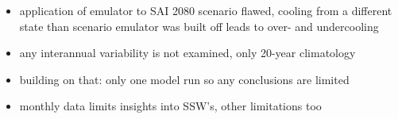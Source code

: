 \begin{itemize}
    \item application of emulator to SAI 2080 scenario flawed, cooling from a different state than scenario emulator was built off leads to over- and undercooling
    \item any interannual variability is not examined, only 20-year climatology
    \item building on that: only one model run so any conclusions are limited
    \item monthly data limits insights into SSW's, other limitations too
\end{itemize}

